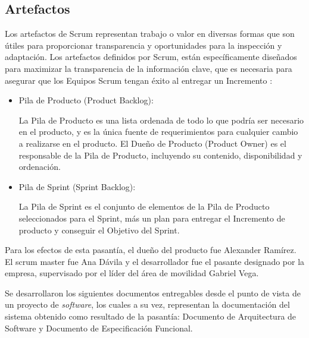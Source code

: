 \subsection{Artefactos}
Los artefactos de Scrum representan trabajo o valor en diversas formas que son útiles para proporcionar transparencia y oportunidades para la inspección y adaptación. Los artefactos definidos por Scrum, están específicamente diseñados para maximizar la transparencia de la información clave, que es necesaria para asegurar que los Equipos Scrum tengan éxito al entregar un Incremento \cite{MMSCRM}:
\begin{itemize}[noitemsep,nolistsep]
\item {Pila de Producto (Product Backlog):}

La Pila de Producto es una lista ordenada de todo lo que podría ser necesario en el producto, y es la única fuente de requerimientos para cualquier cambio a  realizarse en el producto. El Dueño de Producto (Product Owner) es el responsable de la Pila de Producto, incluyendo su contenido, disponibilidad y ordenación.
\item {Pila de Sprint (Sprint Backlog):}

La Pila de Sprint es el conjunto de elementos de la Pila de Producto seleccionados para el Sprint, más un plan para entregar el Incremento de producto y conseguir el Objetivo del Sprint. \\
\end{itemize}
Para los efectos de esta pasantía, el dueño del producto fue Alexander Ramírez. El scrum master fue Ana Dávila y el desarrollador fue el pasante designado por la empresa, supervisado por el líder del área de movilidad Gabriel Vega.

Se desarrollaron los siguientes documentos entregables desde el punto de vista de un proyecto de \textit{software}, los cuales a su vez, representan la documentación del sistema obtenido como resultado de la pasantía: Documento de Arquitectura de Software y Documento de Especificación Funcional.
